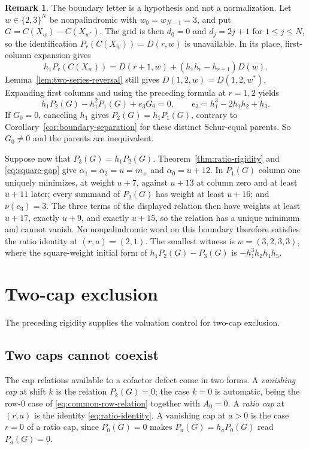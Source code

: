 \documentclass[11pt,a4paper]{amsart}
\numberwithin{equation}{section}
\theoremstyle{plain}
\theoremstyle{definition}
\newtheorem{remark}[theorem]{Remark}
\newcommand{\wt}{\nu}
\begin{document}
\begin{remark}\label{rem:staircase-boundary}
The boundary letter is a hypothesis and not a normalization.  Let
\(w\in\{2,3\}^N\) be nonpalindromic with \(w_0=w_{N-1}=3\), and put
\(G=C(X_w)-C(X_{w^{*}})\).  The grid is then \(d_0=0\) and \(d_j=2j+1\) for
\(1\le j\le N\), so the identification \(P_r(C(X_w))=D(r,w)\) is unavailable.
In its place, first-column expansion gives
\[
h_1P_r(C(X_w))=D(r+1,w)+(h_1h_r-h_{r+1})D(w).
\]
Lemma~\ref{lem:two-series-reversal} still gives \(D(1,2,w)=D(1,2,w^{*})\).
Expanding first columns and using the preceding formula at \(r=1,2\) yields
\[
h_1P_2(G)-h_1^2P_1(G)+e_3G_0=0,
\qquad
e_3=h_1^3-2h_1h_2+h_3 .
\]
If \(G_0=0\), canceling \(h_1\) gives \(P_2(G)=h_1P_1(G)\), contrary to
Corollary~\ref{cor:boundary-separation} for these distinct Schur-equal parents.
So \(G_0\ne0\) and the parents are inequivalent.

Suppose now that \(P_3(G)=h_1P_2(G)\).  Theorem~\ref{thm:ratio-rigidity} and
\eqref{eq:square-gap} give \(\alpha_1=\alpha_2=u=m_+\) and \(\alpha_0=u+12\).
In \(P_1(G)\) column one uniquely minimizes, at weight \(u+7\), against
\(u+13\) at column zero and at least \(u+11\) later; every summand of
\(P_2(G)\) has weight at least \(u+16\); and \(\wt(e_3)=3\).  The three terms
of the displayed relation then have weights at least \(u+17\), exactly
\(u+9\), and exactly \(u+15\), so the relation has a unique minimum and cannot
vanish.  No nonpalindromic word on this boundary therefore satisfies the ratio
identity at \((r,a)=(2,1)\).  The smallest witness is \(w=(3,2,3,3)\), where
the square-weight initial form of \(h_1P_2(G)-P_3(G)\) is
\(-h_1^3h_2h_4h_5\).
\end{remark}

\section{Two-cap exclusion}\label{sec:two-cap}

The preceding rigidity supplies the valuation control for two-cap exclusion.

\subsection{Two caps cannot coexist}

The cap relations available to a cofactor defect come in two forms.  A \emph{vanishing cap} at shift \(k\) is the relation \(P_k(G)=0\); the case \(k=0\) is automatic, being the row-\(0\) case of \eqref{eq:common-row-relation} together with \(A_0=0\).  A \emph{ratio cap} at \((r,a)\) is the identity \eqref{eq:ratio-identity}.  A vanishing cap at \(a>0\) is the case \(r=0\) of a ratio cap, since \(P_0(G)=0\) makes \(P_a(G)=h_aP_0(G)\) read \(P_a(G)=0\).
\end{document}
